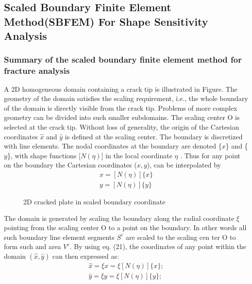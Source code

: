 \documentclass[12pt]{article}
\begin{document}
\subsection{Scaled Boundary Finite Element Method(SBFEM) For Shape Sensitivity Analysis}
\subsubsection{Summary of the scaled boundary finite element method for fracture analysis}A 2D homogeneous domain containing a crack tip is illustrated in Figure. The geometry of the domain satisfies the scaling
requirement, i.e., the whole boundary of the domain is directly visible from the crack tip. Problems of more complex 
geometry can be divided into such smaller subdomains.
The scaling center O is selected at the crack tip.
Without loss of generality, the origin of the Cartesian coordinates $\hat{x}$ and $\hat{y}$
is defined at the scaling center. The boundary is discretized with line elements. The nodal coordinates at the boundary
are denoted \{$x$\} and \{$y$\},
with shape functions [$N( \eta )$] in the local coordinate $\eta$ . Thus for any point on the boundary the Cartesian 
coordinates ($x, y$), can be interpolated by 
\begin{align*}
    x = [N(\eta)]\{x\}\\
    y = [N(\eta)]\{y\} \tag{21} \label{21}
\end{align*}
\begin{figure}[H]
    \centering
    \captionsetup{labelformat=empty}
    \caption{2D cracked plate in scaled boundary coordinate}  
\end{figure}

The domain is generated by scaling the boundary along the radial coordinate $\xi$ 
pointing from the scaling center O to a point
on the boundary. In other words all such boundary line element segments
$S^e$ are scaled to the scaling cen
ter O to form such and area $V^e$. By using eq. (21), the coordinates of any point within the domain $(\hat{x}, \hat{y})$
can then expressed as:
\begin{align*}
    \hat{x} = \xi x = \xi [N(\eta)]\{x\};\\
    \hat{y} = \xi y = \xi [N(\eta)]\{y\}; \tag{22} \label{22}
\end{align*}
\end{document}
